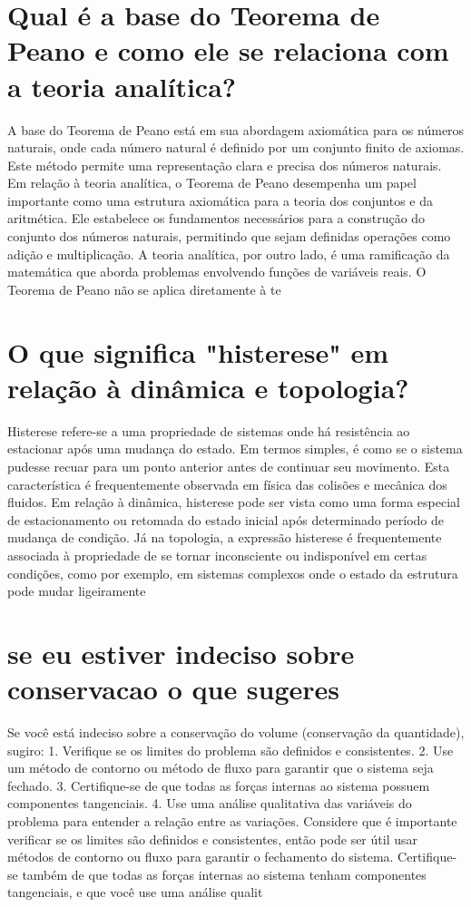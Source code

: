 \documentclass[11pt,a4paper]{article}
\begin{document}
\section{Qual é a base do Teorema de Peano e como ele se relaciona com a teoria analítica?}
A base do Teorema de Peano está em sua abordagem axiomática para os números naturais, onde cada número natural é definido por um conjunto finito de axiomas. Este método permite uma representação clara e precisa dos números naturais. Em relação à teoria analítica, o Teorema de Peano desempenha um papel importante como uma estrutura axiomática para a teoria dos conjuntos e da aritmética. Ele estabelece os fundamentos necessários para a construção do conjunto dos números naturais, permitindo que sejam definidas operações como adição e multiplicação. A teoria analítica, por outro lado, é uma ramificação da matemática que aborda problemas envolvendo funções de variáveis reais. O Teorema de Peano não se aplica diretamente à te

\section{O que significa "histerese" em relação à dinâmica e topologia?}
Histerese refere-se a uma propriedade de sistemas onde há resistência ao estacionar após uma mudança do estado. Em termos simples, é como se o sistema pudesse recuar para um ponto anterior antes de continuar seu movimento. Esta característica é frequentemente observada em física das colisões e mecânica dos fluidos. Em relação à dinâmica, histerese pode ser vista como uma forma especial de estacionamento ou retomada do estado inicial após determinado período de mudança de condição. Já na topologia, a expressão histerese é frequentemente associada à propriedade de se tornar inconsciente ou indisponível em certas condições, como por exemplo, em sistemas complexos onde o estado da estrutura pode mudar ligeiramente

\section{se eu estiver indeciso sobre conservacao o que sugeres}
Se você está indeciso sobre a conservação do volume (conservação da quantidade), sugiro: 1. Verifique se os limites do problema são definidos e consistentes. 2. Use um método de contorno ou método de fluxo para garantir que o sistema seja fechado. 3. Certifique-se de que todas as forças internas ao sistema possuem componentes tangenciais. 4. Use uma análise qualitativa das variáveis do problema para entender a relação entre as variações. Considere que é importante verificar se os limites são definidos e consistentes, então pode ser útil usar métodos de contorno ou fluxo para garantir o fechamento do sistema. Certifique-se também de que todas as forças internas ao sistema tenham componentes tangenciais, e que você use uma análise qualit
\end{document}
